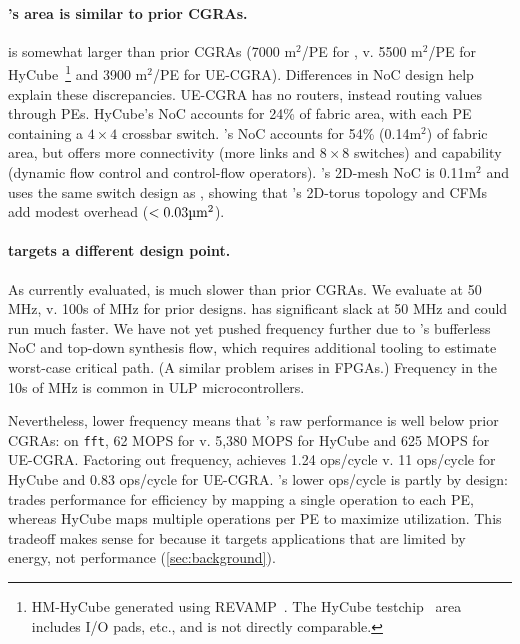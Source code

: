 \paragraph{\riptide's area is similar to prior CGRAs.}
\riptide is somewhat larger than prior CGRAs
(7000 \textmu m$^2$/PE for \riptide, v.
5500 \textmu m$^2$/PE for HyCube~\cite{revamp}\footnote{HM-HyCube generated using REVAMP~\cite{revamp}. The HyCube testchip~\cite{wang2019hycube} area includes I/O pads, etc., and is not directly comparable.}
and 3900 \textmu m$^2$/PE for UE-CGRA).
% 
Differences in NoC design help explain these discrepancies.
%
UE-CGRA has no routers, instead routing values through PEs.
%
% 
HyCube's NoC accounts for 24\% of fabric area, with each PE containing a $4\times4$ crossbar switch.
% 
\riptide's NoC accounts for 54\% (0.14\textmu m$^2$) of fabric area, but offers more connectivity (more links and $8\times8$ switches) and capability (dynamic flow control and control-flow operators).
%
\snafu's 2D-mesh NoC is 0.11\textmu m$^2$ and uses the same switch design as \riptide, showing that \riptide's 2D-torus topology and CFMs add modest overhead ($<0.03\text{\textmu m}^2$).

\paragraph{\riptide targets a different design point.}
As currently evaluated, \riptide is much slower than prior CGRAs.
%
We evaluate \riptide at 50 MHz,
v. 100s of MHz for prior designs.
%
\riptide has significant slack at 50 MHz
and could run much faster.
%
We have not yet pushed frequency further
due to \riptide's bufferless NoC
and top-down synthesis flow,
which requires additional tooling to
estimate worst-case critical path.
(A similar problem arises in FPGAs.)
%
Frequency in the 10s of MHz is
common in ULP microcontrollers.

Nevertheless, lower frequency means that \riptide's raw performance is well below prior CGRAs:
%
on {\tt fft}, 62 MOPS for \riptide v. 5,380 MOPS for HyCube
and 625 MOPS for UE-CGRA.
%
Factoring out frequency, \riptide achieves 1.24 ops/cycle
v. 11 ops/cycle for HyCube
and 0.83 ops/cycle for UE-CGRA.
%
\riptide's lower ops/cycle is partly by design:
\riptide trades performance for efficiency by mapping a single operation to each PE,
whereas HyCube maps multiple operations per PE to maximize utilization.
%
This tradeoff makes sense for \riptide
because it targets applications
that are limited by energy, not performance (\autoref{sec:background}).

